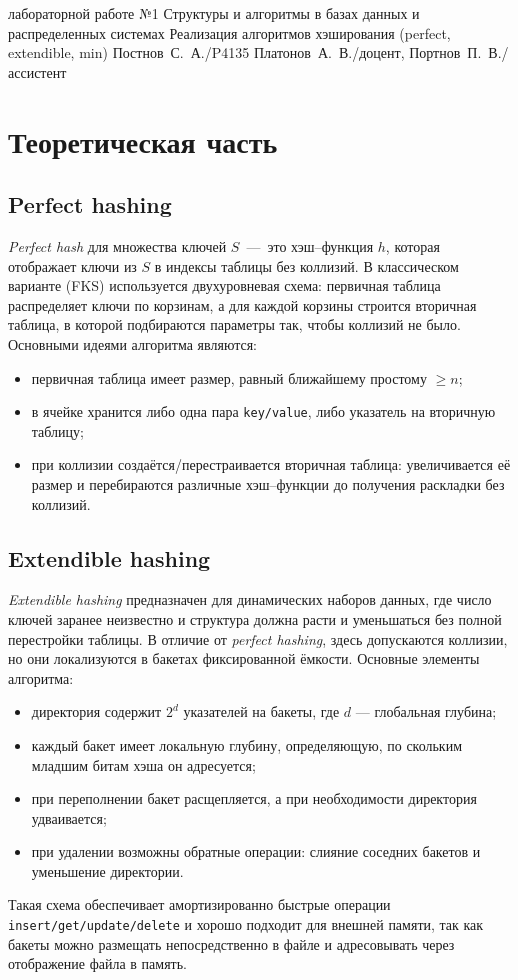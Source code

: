 \documentclass{itmo}
\begin{document}
\makereporttitle{}
	{лабораторной работе №1}
	{Структуры и алгоритмы в базах данных и распределенных системах}
	{Реализация алгоритмов хэширования (perfect, extendible, min)}
	{}
	{Постнов~С.~А./P4135}
	{Платонов~А.~В./доцент, Портнов~П.~В./ассистент}

\maketableofcontents

\chapter{Теоретическая часть}

\section{Perfect hashing}

\textit{Perfect hash} для множества ключей $S$~---~это хэш--функция $h$, которая отображает ключи из $S$ в индексы таблицы без коллизий.
В классическом варианте (FKS) используется двухуровневая схема: первичная таблица распределяет ключи по корзинам, а для каждой корзины строится вторичная таблица, в которой подбираются параметры так, чтобы коллизий не было.
Основными идеями алгоритма являются:
\begin{itemize}
	\item первичная таблица имеет размер, равный ближайшему простому $\ge n$;
	\item в ячейке хранится либо одна пара \texttt{key/value}, либо указатель на вторичную таблицу;
	\item при коллизии создаётся/перестраивается вторичная таблица: увеличивается её размер и перебираются различные хэш--функции до получения раскладки без коллизий.
\end{itemize}

\section{Extendible hashing}

\textit{Extendible hashing} предназначен для динамических наборов данных, где число ключей заранее неизвестно и структура должна расти и уменьшаться без полной перестройки таблицы.
В отличие от \textit{perfect hashing}, здесь допускаются коллизии, но они локализуются в бакетах фиксированной ёмкости.
Основные элементы алгоритма:
\begin{itemize}
	\item директория содержит $2^d$ указателей на бакеты, где $d$ --- глобальная глубина;
	\item каждый бакет имеет локальную глубину, определяющую, по скольким младшим битам хэша он адресуется;
	\item при переполнении бакет расщепляется, а при необходимости директория удваивается;
	\item при удалении возможны обратные операции: слияние соседних бакетов и уменьшение директории.
\end{itemize}
Такая схема обеспечивает амортизированно быстрые операции \texttt{insert/get/update/delete} и хорошо подходит для внешней памяти, так как бакеты можно размещать непосредственно в файле и адресовывать через отображение файла в память.
\end{document}
